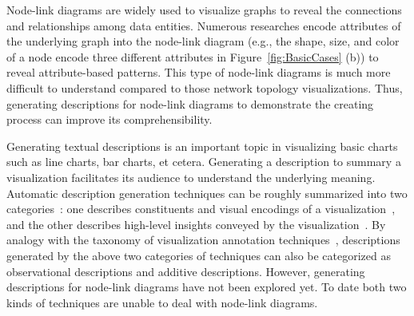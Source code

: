 \maketitle

Node-link diagrams are widely used to visualize graphs to reveal the connections and relationships among data entities.
Numerous researches encode attributes of the underlying graph into the node-link diagram (e.g., the shape, size, and color of a node encode three different attributes in Figure~\ref{fig:BasicCases} (b)) to reveal attribute-based patterns.
This type of node-link diagrams is much more difficult to understand compared to those network topology visualizations. 
Thus, generating descriptions for node-link diagrams to demonstrate the creating process can improve its comprehensibility.

Generating textual descriptions is an important topic in visualizing basic charts such as line charts, bar charts, et cetera.
Generating a description to summary a visualization facilitates its audience to understand the underlying meaning.
Automatic description generation techniques can be roughly summarized into two categories~\cite{DBLP:conf/inlg/ObeidH20}: one describes constituents and visual encodings of a  visualization~\cite{DBLP:journals/coling/MittalMCR98, DBLP:journals/tochi/FerresLST13}, and the other describes high-level insights conveyed by the visualization~\cite{DBLP:conf/apvis/LiuXHWY20, DBLP:conf/inlg/ObeidH20}.
By analogy with the taxonomy of visualization annotation techniques~\cite{DBLP:conf/chi/HullmanDA13}, descriptions generated by the above two categories of techniques can also be categorized as observational descriptions and additive descriptions.
However, generating descriptions for node-link diagrams have not been explored yet.
To date both two kinds of techniques are unable to deal with node-link diagrams.

